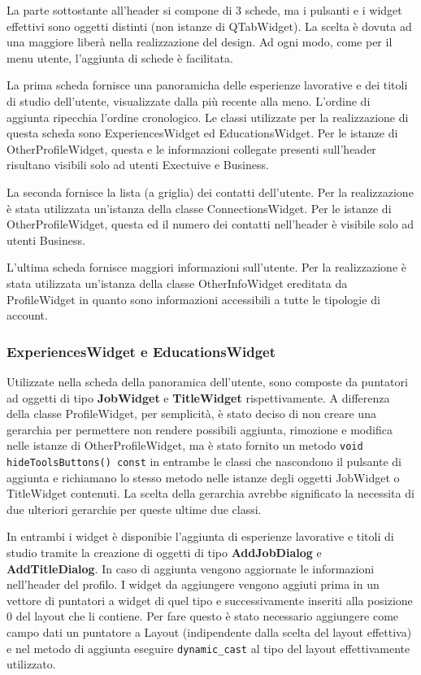 \documentclass[a4paper,10pt]{article}
\begin{document}
La parte sottostante all'header si compone di 3 schede, ma i pulsanti e i widget effettivi sono oggetti distinti (non istanze di QTabWidget). La scelta è dovuta ad una maggiore liberà nella realizzazione del design. Ad ogni modo, come per il menu utente, l'aggiunta di schede è facilitata. 

La prima scheda fornisce una panoramicha delle esperienze lavorative e dei titoli di studio dell'utente, visualizzate dalla più recente alla meno. L'ordine di aggiunta ripecchia l'ordine cronologico. Le classi utilizzate per la realizzazione di questa scheda sono ExperiencesWidget ed EducationsWidget. Per le istanze di OtherProfileWidget, questa e le informazioni collegate presenti sull'header risultano visibili solo ad utenti Exectuive e Business.

La seconda fornisce la lista (a griglia) dei contatti dell'utente. Per la realizzazione è stata utilizzata un'istanza della classe ConnectionsWidget. Per le istanze di OtherProfileWidget, questa ed il numero dei contatti nell'header è visibile solo ad utenti Business.

L'ultima scheda fornisce maggiori informazioni sull'utente. Per la realizzazione è stata utilizzata un'istanza della classe OtherInfoWidget ereditata da ProfileWidget in quanto sono informazioni accessibili a tutte le tipologie di account.

\subsubsection*{ExperiencesWidget e EducationsWidget}
Utilizzate nella scheda della panoramica dell'utente, sono composte da puntatori ad oggetti di tipo \textbf{JobWidget} e \textbf{TitleWidget} rispettivamente. A differenza della classe ProfileWidget, per semplicità, è stato deciso di non creare una gerarchia per permettere non rendere possibili aggiunta, rimozione e modifica nelle istanze di OtherProfileWidget, ma è stato fornito un metodo \texttt{void hideToolsButtons() const} in entrambe le classi che nascondono il pulsante di aggiunta e richiamano lo stesso metodo nelle istanze degli oggetti JobWidget o TitleWidget contenuti. La scelta della gerarchia avrebbe significato la necessita di due ulteriori gerarchie per queste ultime due classi.

In entrambi i widget è disponibie l'aggiunta di esperienze lavorative e titoli di studio tramite la creazione di oggetti di tipo \textbf{AddJobDialog} e \textbf{AddTitleDialog}. In caso di aggiunta vengono aggiornate le informazioni nell'header del profilo. I widget da aggiungere vengono aggiuti prima in un vettore di puntatori a widget di quel tipo e successivamente inseriti alla posizione 0 del layout che li contiene. Per fare questo è stato necessario aggiungere come campo dati un puntatore a Layout (indipendente dalla scelta del layout effettiva) e nel metodo di aggiunta eseguire \texttt{dynamic\_cast} al tipo del layout effettivamente utilizzato.
\end{document}
